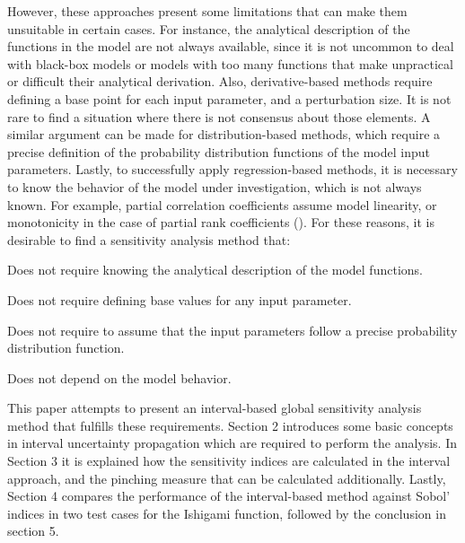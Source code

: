 \documentclass[twocolumn]{rps-esrel2022}
\begin{document}
However, these approaches present some limitations that can make them unsuitable in certain cases.
For instance, the analytical description of the functions in the model are not always available, since it is not uncommon to deal with black-box models or
models with too many functions that make unpractical or difficult their analytical derivation.
Also, derivative-based methods require defining a base point for each input parameter, and a perturbation size.
It is not rare to find a situation where there is not consensus about those elements.
A similar argument can be made for distribution-based methods, which require a precise definition of the probability distribution functions of the model input
parameters.
Lastly, to successfully apply regression-based methods, it is necessary to know the behavior of the model under investigation, which is not always known.
For example, partial correlation coefficients assume model linearity, or monotonicity in the case of partial rank coefficients (\cite{saltelli1990non}).
For these reasons, it is desirable to find a sensitivity analysis method that:

\begin{itemlist}

	\item{}  Does not require knowing the analytical description of the model functions.
	\item{}  Does not require defining base values for any input parameter.
	\item{}  Does not require to assume that the input parameters follow a precise probability distribution function.
	\item{}  Does not depend on the model behavior.

\end{itemlist}

This paper attempts to present an interval-based global sensitivity analysis method that fulfills these requirements.
Section 2 introduces some basic concepts in interval uncertainty propagation which are required to perform the analysis.
In Section 3 it is explained how the sensitivity indices are calculated in the interval approach, and the
pinching measure that can be calculated additionally.
Lastly, Section 4 compares the performance of the interval-based method against Sobol' indices in two test cases for the
Ishigami function, followed by the conclusion in section 5.

\end{document}
